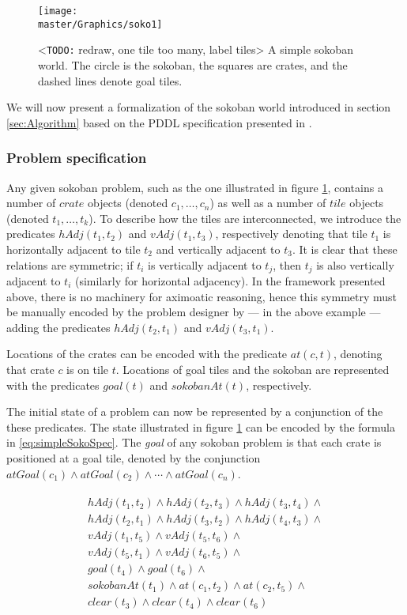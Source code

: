 \documentclass[../Master.tex]{subfiles}
\providecommand{\master}{..}
\begin{document}
\begin{figure}
    \centering
    \texttt{[image: \\master/Graphics/soko1]}
    \caption{\label{fig:simpleSokoban} <\texttt{TODO:} redraw, one tile too many, label tiles> A simple sokoban world. The circle is the sokoban, the squares are crates, and the dashed lines denote goal tiles.}
\end{figure}

We will now present a formalization of the sokoban world introduced in section \ref{sec:Algorithm} based on the PDDL specification presented in \cite{BS2011}.

\subsubsection{Problem specification}
Any given sokoban problem, such as the one illustrated in figure \ref{fig:simpleSokoban}, contains a number of $crate$ objects (denoted $c_1, \dots, c_n$) as well as a number of $tile$ objects (denoted $t_1, \dots, t_k$). To describe how the tiles are interconnected, we introduce the predicates $hAdj(t_1,t_2)$ and $vAdj(t_1,t_3)$, respectively denoting that tile $t_1$ is horizontally adjacent to tile $t_2$ and vertically adjacent to $t_3$. It is clear that these relations are symmetric; if $t_i$ is vertically adjacent to $t_j$, then $t_j$ is also vertically adjacent to $t_i$ (similarly for horizontal adjacency). In the framework presented above, there is no machinery for aximoatic reasoning, hence this symmetry must be manually encoded by the problem designer by --- in the above example --- adding the predicates $hAdj(t_2,t_1)$ and $vAdj(t_3,t_1)$.

Locations of the crates can be encoded with the predicate $at(c, t)$, denoting that crate $c$ is on tile $t$. Locations of goal tiles and the sokoban are represented with the predicates $goal(t)$ and $sokobanAt(t)$, respectively.

The initial state of a problem can now be represented by a conjunction of the these predicates. The state illustrated in figure \ref{fig:simpleSokoban} can be encoded by the formula in \eqref{eq:simpleSokoSpec}. The \textit{goal} of any sokoban problem is that each crate is positioned at a goal tile, denoted by the conjunction $atGoal(c_1) \land atGoal(c_2) \land \cdots \land atGoal(c_n)$.

\begin{gather}
\begin{gathered} \label{eq:simpleSokoSpec}
    hAdj(t_1, t_2) \land hAdj(t_2, t_3) \land hAdj(t_3, t_4) \land \\
    hAdj(t_2, t_1) \land hAdj(t_3, t_2) \land hAdj(t_4, t_3) \land \\
    vAdj(t_1, t_5) \land vAdj(t_5, t_6) \land \\
    vAdj(t_5, t_1) \land vAdj(t_6, t_5) \land \\
    goal(t_4) \land goal(t_6) \land \\
    sokobanAt(t_1) \land at(c_1, t_2) \land at(c_2, t_5) \land \\
    clear(t_3) \land clear(t_4) \land clear(t_6)
\end{gathered}
\end{gather}
\end{document}
